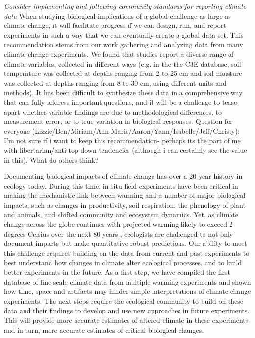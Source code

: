 \documentclass{article}
\begin{document}
\par\textit{Consider implementing and following community standards for reporting climate data} 
When studying biological implications of a global challenge as large as climate change, it will facilitate progress if we can design, run, and report experiments in such a way that we can eventually create a global data set. This recommendation stems from our work gathering and analyzing data from many climate change experiments. We found that studies report a diverse range of climate variables, collected in different ways (e.g. in the the C3E database, soil temperature was collected at depths ranging from 2 to 25 cm and soil moisture was collected at depths ranging from 8 to 30 cm, using different units and methods). It has been difficult to synthesize these data in a comprehensive way that can fully address important questions, and it will be a challenge to tease apart whether variable findings are due to methodological differences, to measurement error, or to true variation in biological responses. Question for everyone (Lizzie/Ben/Miriam/Ann Marie/Aaron/Yann/Isabelle/Jeff/Christy): I'm not sure if i want to keep this recommendation- perhaps its the part of me with libertarian/anti-top-down tendencies (although i can certainly see the value in this). What do others think?

\par Documenting biological impacts of climate change has over a 20 year history in ecology today. During this time, in situ field experiments have been critical in making the mechanistic link between warming and a number of major biological impacts, such as changes in productivity, soil respiration, the phenology of plant and animals, and shifted community and ecosystem dynamics. Yet, as climate change across the globe continues with projected warming likely to exceed 2 degrees Celsius over the next 80 years \citep{ipcc2013}, ecologists are challenged to not only document impacts but make quantitative robust predictions. Our ability to meet this challenge requires building on the data from current and past experiments to best understand how changes in climate alter ecological processes, and to build better experiments in the future. As a first step, we have compiled the first database of fine-scale climate data from multiple warming experiments and shown how time, space and artifacts may hinder simple interpretations of climate change experiments. The next steps require the ecological community to build on these data and their findings to develop and use new approaches in future experiments. This will provide more accurate estimates of altered climate in these experiments and in turn, more accurate estimates of critical biological changes. 

\clearpage
\end{document}
